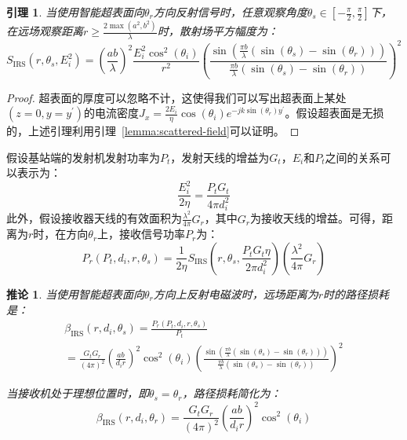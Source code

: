 \documentclass[supercite]{HustGraduPaper}
\newtheorem{lemma}{\indent 引理}[section]
\newtheorem{corollary}{\indent 推论}[section]
\begin{document}
\begin{lemma}
	当使用智能超表面向$\theta_r$方向反射信号时，任意观察角度$\theta_{s} \in\left[-\frac{\pi}{2}, \frac{\pi}{2}\right]$下，在远场观察距离$r \geq \frac{2 \max \left(a^{2}, b^{2}\right)}{\lambda}$时，散射场平方幅度为：
	\begin{equation}
		S_{\mathrm{IRS}}\left(r, \theta_{s}, E_{i}^{2}\right) =\left(\frac{a b}{\lambda}\right)^{2} \frac{E_{i}^{2} \cos ^{2}\left(\theta_{i}\right)}{r^{2}}\left(\frac{\sin \left(\frac{\pi b}{\lambda}\left(\sin \left(\theta_{s}\right)-\sin \left(\theta_{r}\right)\right)\right)}{\frac{\pi b}{\lambda}\left(\sin \left(\theta_{s}\right)-\sin \left(\theta_{r}\right)\right)}\right)^{2}
	\end{equation}
\end{lemma}

\begin{proof}
	超表面的厚度可以忽略不计，这使得我们可以写出超表面上某处$(z=0, y=y^\prime)$的电流密度$J_{x}=\frac{2 E_{i}}{\eta} \cos \left(\theta_{i}\right) e^{-j k \sin \left(\theta_{r}\right) y^{\prime}}$。假设超表面是无损的，上述引理利用引理~\ref{lemma:scattered-field}可以证明。
\end{proof}

假设基站端的发射机发射功率为$P_t$，发射天线的增益为$G_t$，$E_i$和$P_t$之间的关系可以表示为：
\begin{equation}
	\frac{E_{i}^{2}}{2 \eta}=\frac{P_{t} G_{t}}{4 \pi d_{i}^{2}}
\end{equation}
此外，假设接收器天线的有效面积为$\frac{\lambda^2}{4\pi} G_r$，其中$G_r$为接收天线的增益。可得，距离为$r$时，在方向$\theta_r$上，接收信号功率$P_r$为：
\begin{equation}
	P_{r}\left(P_{t}, d_{i}, r, \theta_{s}\right)=\frac{1}{2 \eta} S_{\mathrm{IRS}}\left(r, \theta_{s}, \frac{P_{t} G_{t} \eta}{2 \pi d_{i}^{2}}\right)\left(\frac{\lambda^{2}}{4 \pi} G_{r}\right)
\end{equation}

\begin{corollary}
	当使用智能超表面向$\theta_r$方向上反射电磁波时，远场距离为$r$时的路径损耗是：
	\begin{equation}
		\begin{array}{l}
			\beta_{\mathrm{IRS}}\left(r, d_{i}, \theta_{s}\right)=\frac{P_{r}\left(P_{t}, d_{i}, r, \theta_{s}\right)}{P_{t}} \\
			=\frac{G_{t} G_{r}}{(4 \pi)^{2}}\left(\frac{a b}{d_{i} r}\right)^{2} \cos ^{2}\left(\theta_{i}\right)\left(\frac{\sin \left(\frac{\pi b}{\lambda}\left(\sin \left(\theta_{s}\right)-\sin \left(\theta_{r}\right)\right)\right)}{\frac{\pi b}{\lambda}\left(\sin \left(\theta_{s}\right)-\sin \left(\theta_{r}\right)\right)}\right)^{2}
		\end{array}
	\end{equation}

	当接收机处于理想位置时，即$\theta_s=\theta_r$，路径损耗简化为：
	\begin{equation}
		\beta_{\mathrm{IRS}}\left(r, d_{i}, \theta_{r}\right)=\frac{G_{t} G_{r}}{(4 \pi)^{2}}\left(\frac{a b}{d_{i} r}\right)^{2} \cos ^{2}\left(\theta_{i}\right)
	\end{equation}
\end{corollary}
\end{document}
